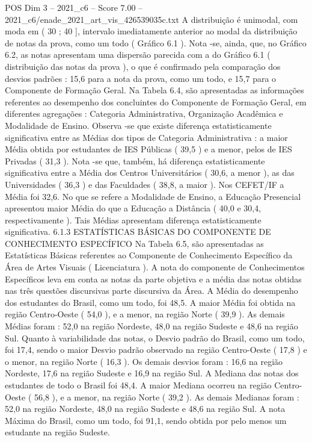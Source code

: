 \begin{textsample}{POS Dim 3 – 2021\_c6 – Score 7.00 – 2021\_c6/enade\_2021\_art\_vis\_426539035c.txt}
A distribuição é unimodal, com moda em ( 30 ; 40 ], intervalo imediatamente anterior ao modal da distribuição de notas da prova, como um todo ( Gráfico 6.1 ).
Nota -se, ainda, que, no Gráfico 6.2, as notas apresentam uma dispersão parecida com a do Gráfico 6.1 ( distribuição das notas da prova ), o que é confirmado pela comparação dos desvios padrões : 15,6 para a nota da prova, como um todo, e 15,7 para o Componente de Formação Geral.
Na Tabela 6.4, são apresentadas as informações referentes ao desempenho dos concluintes do Componente de Formação Geral, em diferentes agregações : Categoria Administrativa, Organização Acadêmica e Modalidade de Ensino.
Observa -se que existe diferença estatisticamente significativa entre as Médias dos tipos de Categoria Administrativa : a maior Média obtida por estudantes de IES Públicas ( 39,5 ) e a menor, pelos de IES Privadas ( 31,3 ).
Nota -se que, também, há diferença estatisticamente significativa entre a Média dos Centros Universitários ( 30,6, a menor ), as das Universidades ( 36,3 ) e das Faculdades ( 38,8, a maior ).
Nos CEFET/IF a Média foi 32,6.
No que se refere a Modalidade de Ensino, a Educação Presencial apresentou maior Média do que a Educação a Distância ( 40,0 e 30,4, respectivamente ).
Tais Médias apresentam diferença estatisticamente significativa. 6.1.3 ESTATÍSTICAS BÁSICAS DO COMPONENTE DE CONHECIMENTO ESPECÍFICO Na Tabela 6.5, são apresentadas as Estatísticas Básicas referentes ao Componente de Conhecimento Específico da Área de Artes Visuais ( Licenciatura ).
A nota do componente de Conhecimentos Específicos leva em conta as notas da parte objetiva e a média das notas obtidas nas três questões discursivas parte discursiva da Área.
A Média do desempenho dos estudantes do Brasil, como um todo, foi 48,5.
A maior Média foi obtida na região Centro-Oeste ( 54,0 ), e a menor, na região Norte ( 39,9 ).
As demais Médias foram : 52,0 na região Nordeste, 48,0 na região Sudeste e 48,6 na região Sul.
Quanto à variabilidade das notas, o Desvio padrão do Brasil, como um todo, foi 17,4, sendo o maior Desvio padrão observado na região Centro-Oeste ( 17,8 ) e o menor, na região Norte ( 16,3 ).
Os demais desvios foram : 16,6 na região Nordeste, 17,6 na região Sudeste e 16,9 na região Sul.
A Mediana das notas dos estudantes de todo o Brasil foi 48,4.
A maior Mediana ocorreu na região Centro-Oeste ( 56,8 ), e a menor, na região Norte ( 39,2 ).
As demais Medianas foram : 52,0 na região Nordeste, 48,0 na região Sudeste e 48,6 na região Sul.
A nota Máxima do Brasil, como um todo, foi 91,1, sendo obtida por pelo menos um estudante na região Sudeste.

\end{textsample}
